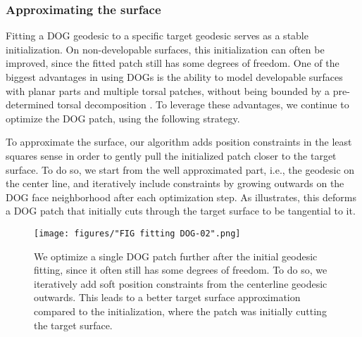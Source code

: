\subsubsection{Approximating the surface} 

Fitting a DOG geodesic to a specific target geodesic serves as a stable initialization. On non-developable surfaces, this initialization can often be improved, since the fitted patch still has some degrees of freedom.
One of the biggest advantages in using DOGs is the ability to model developable surfaces with planar parts and multiple torsal patches, without being bounded by a pre-determined torsal decomposition \cite{Rabinovich:DogNets:2018}. 
To leverage these advantages, we continue to optimize the DOG patch, using the following strategy.

To approximate the surface, our algorithm adds position constraints in the least squares sense in order to gently pull the initialized patch closer to the target surface. 
To do so, we start from the well approximated part, i.e., the geodesic on the center line, and iteratively include constraints by growing outwards on the DOG face neighborhood after each optimization step. As  illustrates, this deforms a DOG patch that initially cuts  through the target surface to be tangential to it.

\begin{figure} [h!]
\centering
\noindent\texttt{[image: figures/"FIG fitting DOG-02".png]}
\caption{
	We optimize a single DOG patch further after the initial geodesic fitting, since it often still has some degrees of freedom. To do so, we iteratively add soft position constraints from the centerline geodesic outwards. This leads to a better target surface approximation compared to the initialization, where the patch was initially cutting the target surface.
	\label{fig:single_patch_constraints_growing}}
\end{figure}

